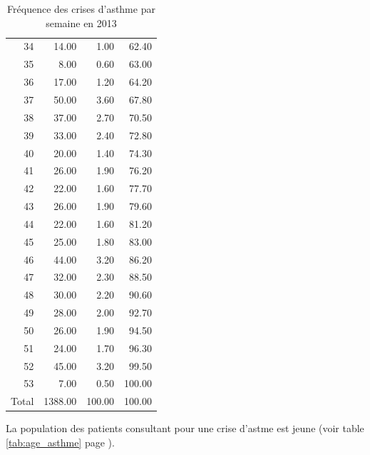 \documentclass[12pt,english,french,twoside]{book}\usepackage[]{graphicx}\usepackage[]{color}
\makeatletter
\newenvironment{kframe}{%
 \def\at@end@of@kframe{}%
 \ifinner\ifhmode%
  \def\at@end@of@kframe{\end{minipage}}%
  \begin{minipage}{\columnwidth}%
 \fi\fi%
 \def\FrameCommand##1{\hskip\@totalleftmargin \hskip-\fboxsep
 \colorbox{shadecolor}{##1}\hskip-\fboxsep
     \hskip-\linewidth \hskip-\@totalleftmargin \hskip\columnwidth}%
 \MakeFramed {\advance\hsize-\width
   \@totalleftmargin\z@ \linewidth\hsize
   \@setminipage}}%
 {\par\unskip\endMakeFramed%
 \at@end@of@kframe}
\makeatother
\begin{document}
\begin{table}[ht]
\begin{tabular}{rrrr}
  34 & 14.00 & 1.00 & 62.40 \\ 
  35 & 8.00 & 0.60 & 63.00 \\ 
  36 & 17.00 & 1.20 & 64.20 \\ 
  37 & 50.00 & 3.60 & 67.80 \\ 
  38 & 37.00 & 2.70 & 70.50 \\ 
  39 & 33.00 & 2.40 & 72.80 \\ 
  40 & 20.00 & 1.40 & 74.30 \\ 
  41 & 26.00 & 1.90 & 76.20 \\ 
  42 & 22.00 & 1.60 & 77.70 \\ 
  43 & 26.00 & 1.90 & 79.60 \\ 
  44 & 22.00 & 1.60 & 81.20 \\ 
  45 & 25.00 & 1.80 & 83.00 \\ 
  46 & 44.00 & 3.20 & 86.20 \\ 
  47 & 32.00 & 2.30 & 88.50 \\ 
  48 & 30.00 & 2.20 & 90.60 \\ 
  49 & 28.00 & 2.00 & 92.70 \\ 
  50 & 26.00 & 1.90 & 94.50 \\ 
  51 & 24.00 & 1.70 & 96.30 \\ 
  52 & 45.00 & 3.20 & 99.50 \\ 
  53 & 7.00 & 0.50 & 100.00 \\ 
    Total & 1388.00 & 100.00 & 100.00 \\ 
   \hline
\end{tabular}
\caption[Fréquence des crises d'asthme]{Fréquence des crises d'asthme par semaine en 2013} 
\label{tab:freq_asthme}
\end{table}




La population des patients consultant pour une crise d'astme est jeune (voir table \ref{tab:age_asthme} page \pageref{tab:age_asthme}).

\begin{kframe}


{\ttfamily\noindent\bfseries\color{errorcolor}{\#\# Error: invalid 'row.names' length}}

{\ttfamily\noindent\color{warningcolor}{\#\# Warning: argument is not numeric or logical: returning NA}}

{\ttfamily\noindent\bfseries\color{errorcolor}{\#\# Error: need numeric data}}

{\ttfamily\noindent\bfseries\color{errorcolor}{\#\# Error: attempt to set 'rownames' on an object with no dimensions}}

{\ttfamily\noindent\bfseries{}}\end{kframe}
\end{document}

